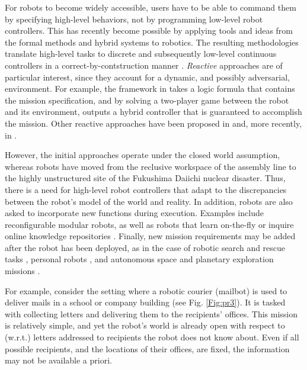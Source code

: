 For robots to become widely accessible, users have to be able to command them by specifying high-level behaviors, not by programming low-level robot controllers.
This has recently become possible by applying tools and ideas from the formal methods and hybrid systems to robotics. The resulting methodologies translate high-level tasks to discrete and subsequently low-level continuous controllers in a correct-by-contstruction manner \cite{}.
\emph{Reactive} approaches are of particular interest, since they account for a dynamic, and possibly adversarial, environment. For example, the framework in \cite{KGFP_TRO09} takes a logic formula that contains the mission specification, and by solving a two-player game between the robot and its environment, outputs a hybrid controller that is guaranteed to accomplish the mission. Other reactive approaches have been proposed in \cite{Wongpiromsarn2010} and, more recently, in \cite{Belta2013RSS}.

However, the initial approaches operate under the closed world assumption, whereas robots have moved from the reclusive workspace of the assembly line to the highly unstructured site of the Fukushima Daiichi nuclear disaster. 
Thus, there is a need for high-level robot controllers that adapt to the discrepancies between the robot's model of the world and reality. 
In addition, robots are also asked to incorporate new functions during execution. 
Examples include reconfigurable modular robots, as well as robots that learn on-the-fly \cite{SaxenaIJRR2012} or inquire online knowledge repositories \cite{rapyuta2013}. 
Finally, new mission requirements may be added after the robot has been deployed, as in the case of robotic search and rescue tasks \cite{MatthiasAI2010}, personal robots \cite{}, and autonomous space and planetary exploration missions \cite{spaceXplore2006}. 

For example, consider the setting where a robotic courier (mailbot) is used to deliver mails in a school or company building (see Fig. \ref{Fig:pr3}). It is tasked with collecting letters and delivering them to the recipients' offices. 
This mission is relatively simple, and yet the robot's world is already open with respect to (w.r.t.) letters addressed to recipients the robot does not know about. %
Even if all possible recipients, and the locations of their offices, are fixed, the information may not be available a priori.

